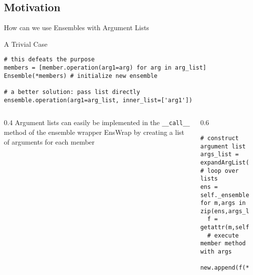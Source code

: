 \documentclass[hyperref={pdfpagelabels=false},compress,final]{beamer}
\newenvironment{myCode}[3][shadow=true]%
{\begin{center} \begin{minipage}{#2} \begin{beamerboxesrounded}[#1]{#3}}%
      {\end{beamerboxesrounded} \end{minipage} \end{center}}
\begin{document}
\subsection*{Motivation}

\begin{frame}[fragile=singleslide]{How can we use Ensembles with Argument Lists}
  \vspace*{-.25cm}
  \begin{myCode}{\textwidth}{A Trivial Case}
    \small
    \begin{verbatim}
# this defeats the purpose
members = [member.operation(arg1=arg) for arg in arg_list]
Ensemble(*members) # initialize new ensemble

# a better solution: pass list directly
ensemble.operation(arg1=arg_list, inner_list=['arg1'])
    \end{verbatim}
  \end{myCode}
  \vspace*{-.25cm}
  \begin{columns}
    \begin{column}{0.4\textwidth}
      Argument lists can easily be implemented in the \texttt{\_\_call\_\_} method of the ensemble wrapper EnsWrap by creating a list of arguments for each member
    \end{column}
    \begin{column}{0.6\textwidth}
      \vspace*{-.25cm}
      \begin{myCode}{1.\textwidth}{}
        \small
        \begin{verbatim}
# construct argument list
args_list = expandArgList(**kwargs)
# loop over lists
ens = self._ensemble
for m,args in zip(ens,args_list):
  f = getattr(m,self.attr)
  # execute member method with args
  new.append(f(**args))
        \end{verbatim}
      \end{myCode}
    \end{column}
  \end{columns}
\end{frame}
\end{document}
